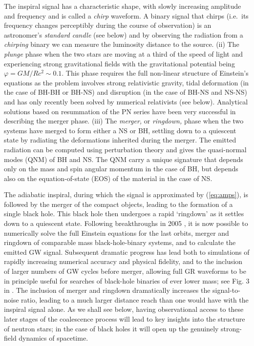 The inspiral signal has a characteristic shape,
with slowly increasing amplitude and frequency and is called a {\it chirp} 
waveform.  A binary signal that chirps (i.e.\ its frequency changes 
perceptibly during the course of observation) is an astronomer's {\it standard 
candle} \cite{Schutz86} (see below) and by observing the radiation from
a {\it chirping} binary we can measure the luminosity distance to the source.
(ii) The {\it plunge} phase when the two stars are moving at a 
third of the speed of light and experiencing strong gravitational fields with 
the gravitational potential being $\varphi = GM/Rc^2 \sim 0.1.$ This
phase requires the full non-linear structure of Einstein's equations 
as the problem involves strong relativistic gravity, tidal deformation
(in the case of BH-BH or BH-NS) and disruption (in the case of BH-NS and NS-NS)
and has only recently been solved by numerical relativists (see below). 
Analytical solutions based on resummation of the PN series have been very
successful in describing the merger phase.
(iii) The {\it merger,} or {\it ringdown,} phase when the 
two systems have merged to form either a NS or BH, settling down to a 
quiescent state by radiating the deformations inherited during the merger. 
The emitted radiation can be computed using perturbation theory and 
gives the quasi-normal modes (QNM) of BH and NS. The QNM carry 
a unique signature that depends only on the mass and spin angular momentum
in the case of BH, but depends also on the equation-of-state (EOS) 
of the material in the case of NS.  

The adiabatic inspiral, during which the signal is approximated by (\ref{eq:amps}),
is followed by the merger of the compact objects, leading to the formation of a single
black hole. This black hole then undergoes a rapid `ringdown' as it settles down 
to a quiescent state. Following breakthroughs in 2005
\cite{Pretorius05,Campanelli:2005dd,Baker:2005vv}, 
it is now possible to numerically solve the
full Einstein equations for the last orbits, merger and ringdown of
comparable mass black-hole-binary systems, and to calculate the
emitted GW signal. Subsequent dramatic progress has lead both to
simulations of rapidly increasing numerical accuracy and physical
fidelity, and to the inclusion of larger numbers of GW cycles before 
merger, allowing full GR waveforms to be in principle useful for searches of
black-hole binaries of ever lower mass; see Fig. 3 in \cite{Hannam:2009rd}.
The inclusion of merger and ringdown dramatically increases the signal-to-noise
ratio, leading to a much larger distance reach than one would have with the
inspiral signal alone. As we shall see below, having observational access to 
these later stages of the coalescence 
process will lead to key insights into the structure of neutron stars; in the
case of black holes it will open up the genuinely strong-field dynamics 
of spacetime. 

